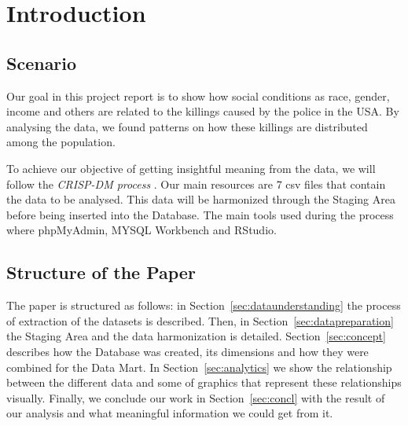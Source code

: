 \documentclass[11pt, journal]{IEEEtran}
\begin{document}

\section{Introduction}
\label{sec:intro}
\subsection{Scenario} \label{subsec:scenario}
Our goal in this  project report is to show how social conditions as race, gender, income and others are related to the killings caused by the police in the USA. By analysing the data, we found patterns on how these killings are distributed among the population.

To achieve our objective of getting insightful meaning from the data, we will follow the
\emph{CRISP-DM process}  \cite{wikicrispdm}. Our main resources are 7 csv files that contain the data to be analysed. This data will be harmonized through the Staging Area before being inserted into the Database. The main tools used during the process where phpMyAdmin, MYSQL Workbench
and RStudio.

\subsection{Structure of the Paper} \label{subsec:struct}
The paper is structured as follows: in Section~\ref{sec:dataunderstanding} the process of extraction of the datasets is described.
Then, in Section~\ref{sec:datapreparation} the Staging Area and the data harmonization is detailed.  Section~\ref{sec:concept} describes how the Database was created, its dimensions and how they were combined for the Data Mart. In Section~\ref{sec:analytics} we show the relationship between the different data and some of graphics that represent these relationships visually. Finally, we conclude our work in Section~\ref{sec:concl} with the result of our analysis and what meaningful information we could get from it.

\end{document}

